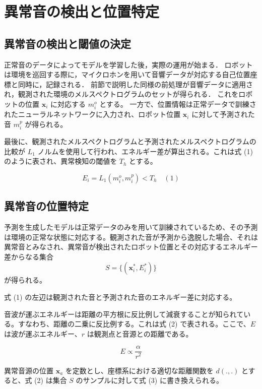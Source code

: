 \documentclass[../main]{subfiles}
\begin{document}
\section{異常音の検出と位置特定}
\label{sec:pmethod_abnormal_detection}


\subsection{異常音の検出と閾値の決定}
正常音のデータによってモデルを学習した後，実際の運用が始まる．
ロボットは環境を巡回する際に，マイクロホンを用いて音響データが対応する自己位置座標と同時に，記録される．
前節で説明した同様の前処理が音響データに適用され，観測された環境のメルスペクトログラムのセットが得られる．
これをロボットの位置 $\mathbf{x}_i$ に対応する $m_i^o$ とする。
一方で、位置情報は正常データで訓練されたニューラルネットワークに入力され、ロボット位置 $\mathbf{x}_i$ に対して予測された音 $m_i^p$ が得られる。

最後に、観測されたメルスペクトログラムと予測されたメルスペクトログラムの比較が $L_1$ ノルムを使用して行われ、エネルギー差が算出される。これは式 (1) のように表され、異常検知の閾値を $T_h$ とする。

\begin{equation}
    E_i = L_1(m_i^o, m_i^p) < T_h \quad (1)
\end{equation}

\subsection{異常音の位置特定}

予測を生成したモデルは正常データのみを用いて訓練されているため、その予測は環境の正常な状態に対応する。観測された音が予測から逸脱した場合、それは異常音とみなされ、異常音が検出されたロボット位置とその対応するエネルギー差からなる集合
\[
S = \{ (\mathbf{x}_i^*, E_i^*) \}
\]
が得られる。



式 (1) の左辺は観測された音と予測された音のエネルギー差に対応する。

音波が運ぶエネルギーは距離の平方根に反比例して減衰することが知られている。すなわち、距離の二乗に反比例する。これは式 (2) で表される。ここで、$E$ は波が運ぶエネルギー、$r$ は観測点と音源との距離である。

\begin{equation}
    E \propto \frac{\alpha}{r^2} \tag{2}
\end{equation}

異常音源の位置 $\mathbf{x}_a$ を定数とし、座標系における適切な距離関数を $d(., .)$ とすると、式 (2) は集合 $S$ のサンプルに対して式 (3) に書き換えられる。
\end{document}
